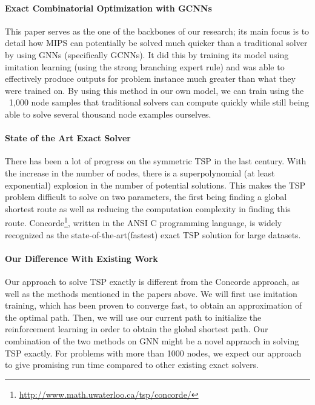 \documentclass{article}
\begin{document}
\paragraph{Exact Combinatorial Optimization with GCNNs \cite{GasseCFCL19}}
This paper serves as the one of the backbones of our research; its main focus is to detail how MIPS can potentially be solved much quicker than a traditional solver by using
GNNs (specifically GCNNs). It did this by training its model using imitation learning (using the strong branching expert rule) and was able to effectively produce outputs for
problem instance much greater than what they were trained on. By using this method in our own model, we can train using the ~1,000 node samples that traditional solvers can
compute quickly while still being able to solve several thousand node examples ourselves.

\paragraph{State of the Art Exact Solver}
There has been a lot of progress on the symmetric TSP in the last century. With the increase in the number of nodes, there is a
superpolynomial (at least exponential) explosion in the number of potential solutions. This makes the
TSP problem difficult to solve on two parameters, the first being finding a global shortest route as well as reducing the computation complexity in finding this route.
Concorde\footnote{\url{http://www.math.uwaterloo.ca/tsp/concorde/}}, written in the ANSI C programming language, is widely recognized as the state-of-the-art(fastest) exact TSP
solution for large datasets.

\paragraph{Our Difference With Existing Work}
Our approach to solve TSP exactly is different from the Concorde approach, as well as the methods mentioned in the papers above. We will first use imitation training, which has
been proven to converge fast, to obtain an approximation of the optimal path. Then, we will use our current path to initialize the reinforcement learning in order to obtain the global
shortest path. Our combination of the two methods on GNN might be a novel appraoch in solving TSP exactly. For problems with more than 1000 nodes, we
expect our approach to give promising run time compared to other existing exact solvers.
\end{document}
